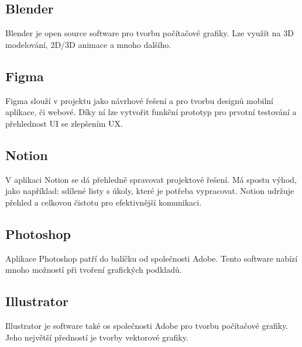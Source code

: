 \subsection{Blender}
Blender je open source software pro tvorbu počítačové grafiky. Lze využít na 3D modelování, 2D/3D animace a mnoho dalšího.

\subsection{Figma}
Figma slouží v projektu jako návrhové řešení a pro tvorbu designů mobilní aplikace, či webové. Díky ní lze vytvořit funkční prototyp pro prvotní testování a přehlednost UI se zlepšením UX.

\subsection{Notion}
V aplikaci Notion se dá přehledně spravovat projektové řešení. Má spostu výhod, jako například: sdílené listy s úkoly, které je potřeba vypracovat. Notion udržuje přehled a celkovou čistotu pro efektivnější komunikaci.

\subsection{Photoshop}
Aplikace Photoshop patří do balíčku od společnosti Adobe. Tento software nabízí mnoho možností při tvoření grafických podkladů.

\subsection{Illustrator}
Illustrator je software také os společnosti Adobe pro tvorbu počítačové grafiky. Jeho největší předností je tvorby vektorové grafiky.